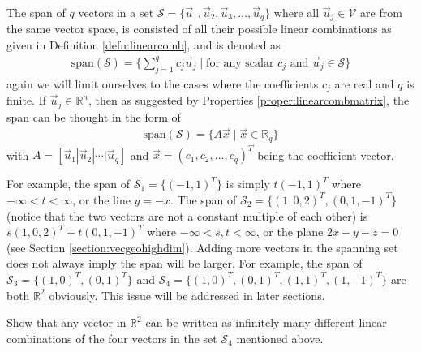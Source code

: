 \begin{defn}[Span]
\label{defn:span}
The span of $q$ vectors in a set $\mathcal{S} = \{\vec{u}_1, \vec{u}_2, \vec{u}_3, \ldots, \vec{u}_q\}$ where all $\vec{u}_j \in \mathcal{V}$ are from the same vector space, is consisted of all their possible linear combinations as given in Definition \ref{defn:linearcomb}, and is denoted as
\begin{align*}
\text{span}(\mathcal{S}) = \{\sum_{j=1}^{q} c_j\vec{u}_j \mid \text{for any scalar $c_j$ and $\vec{u}_j \in \mathcal{S}$}\}
\end{align*}
again we will limit ourselves to the cases where the coefficients $c_j$ are real and $q$ is finite. If $\vec{u}_j \in \mathbb{R}^n$, then as suggested by Properties \ref{proper:linearcombmatrix}, the span can be thought in the form of 
\begin{align*}
\text{span}(\mathcal{S}) = \{A\vec{x} \mid \vec{x} \in \mathbb{R}_q\}
\end{align*}
with $A = [\vec{u}_1|\vec{u}_2|\cdots|\vec{u}_q]$ and
$\vec{x} = (c_1, c_2, \ldots, c_q)^T$ being the coefficient vector.
\end{defn}
For example, the span of $\mathcal{S}_1 = \{(-1,1)^T\}$ is simply $t(-1,1)^T$ where $-\infty < t < \infty$, or the line $y = -x$. The span of $\mathcal{S}_2 = \{(1,0,2)^T, (0,1,-1)^T\}$ (notice that the two vectors are not a constant multiple of each other) is $s(1,0,2)^T + t(0,1,-1)^T$ where $-\infty < s,t < \infty$, or the plane $2x - y - z = 0$ (see Section \ref{section:vecgeohighdim}). Adding more vectors in the spanning set does not always imply the span will be larger. For example, the span of $\mathcal{S}_3 = \{(1,0)^T, (0,1)^T\}$ and $\mathcal{S}_4 = \{(1,0)^T, (0,1)^T, (1,1)^T, (1,-1)^T\}$ are both $\mathbb{R}^2$ obviously. This issue will be addressed in later sections.
\begin{exmp}
\label{exmp:S3S4}
Show that any vector in $\mathbb{R}^2$ can be written as infinitely many different linear combinations of the four vectors in the set $\mathcal{S}_4$ mentioned above.
\end{exmp}
